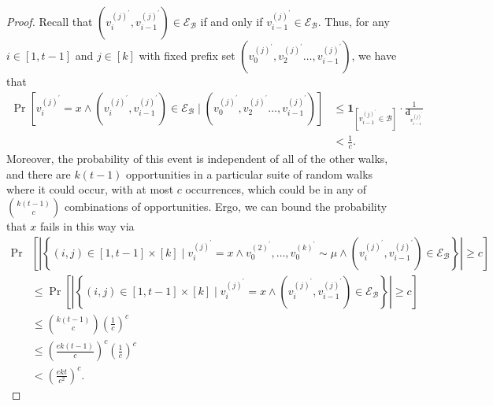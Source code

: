 \documentclass[10]{report}
\begin{document}
\begin{proof}
Recall that $\left ( v_i^{(j)^\prime}, v_{i-1}^{(j)^\prime} \right ) \in \mathcal{E}_\mathcal{B}$ if and only if $v_{i-1}^{(j)^\prime} \in \mathcal{E}_\mathcal{B}$.
Thus, for any $i \in [1, t-1]$ and $j \in [k]$ with fixed prefix set 
$\left (v_0^{(j)^\prime}, v_2^{(j)^\prime} \dots, v_{i-1}^{(j)^\prime} \right )$,
we have that 
%
\begin{align*}
\Pr \left [ 
		v_i^{(j)^\prime} = x \wedge 
		\left ( v_i^{(j)^\prime}, v_{i-1}^{(j)^\prime} \right ) \in \mathcal{E}_\mathcal{B} 
				\mid \left (v_0^{(j)^\prime}, v_2^{(j)^\prime} \dots, v_{i-1}^{(j)^\prime} \right )
\right ]
&\leq
\mathbf{1}_{\left [ v_{i-1}^{(j)^\prime} \in \mathcal{B} \right ]} \cdot \frac{1}{\mathbf{d}_{v_{i-1}^{(j)^\prime}}}
\\
&<
\frac{1}{c}.
\end{align*}
%
Moreover, the probability of this event is independent of all of the other walks, and there are $k(t-1)$ opportunities in a particular suite of random walks where it could occur, with at most $c$ occurrences, which could be in any of ${k(t-1) \choose c}$ combinations of opportunities. 
Ergo, we can bound the probability that $x$ fails in this way via 
\begin{align*}
\Pr &\left [
	\left | \left \{ 
		(i,j) \in [1, t-1] \times [k] 
			\mid v_{i}^{(j)^\prime} = x 
			\wedge v_0^{(2)^\prime}, \dots, v_0^{(k)^\prime} \sim \mu
			\wedge \left ( v_{i}^{(j)^\prime}, v_{i - 1}^{(j)^\prime} \right ) \in \mathcal{E}_\mathcal{B}
	\right \} \right | \geq c
\right ]	
\\
&\leq
\Pr \left [
	\left | \left \{ 
		(i,j) \in [1, t-1] \times [k] 
			\mid v_{i}^{(j)^\prime} = x 
			\wedge \left ( v_{i}^{(j)^\prime}, v_{i - 1}^{(j)^\prime} \right ) \in \mathcal{E}_\mathcal{B}
	\right \} \right | \geq c
\right ]	
\\
&\leq 
{k(t -1) \choose c} \left ( \frac{1}{c} \right )^c
\\
&\leq 
\left ( \frac{ek(t-1)}{c} \right )^c \left ( \frac{1}{c} \right )^c
\\
&< 
\left ( \frac{ekt}{c^2} \right )^c.
\end{align*}
%


\end{proof}
\end{document}
